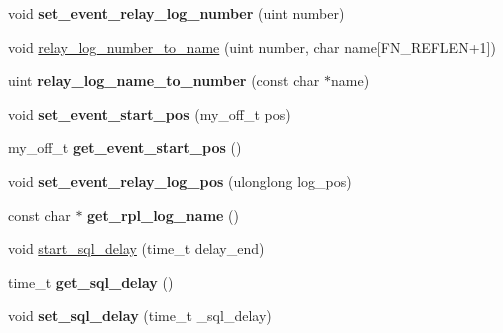 \begin{DoxyCompactItemize}
\mbox{\label{classRelay__log__info_afd826cfd193f05cae10230d6ddd5465a}} 
void {\bfseries set\+\_\+event\+\_\+relay\+\_\+log\+\_\+number} (uint number)
\item 
void \mbox{\hyperlink{classRelay__log__info_ad031830b92120f50723c41006266b8ed}{relay\+\_\+log\+\_\+number\+\_\+to\+\_\+name}} (uint number, char name\mbox{[}F\+N\+\_\+\+R\+E\+F\+L\+EN+1\mbox{]})
\item 
\mbox{\label{classRelay__log__info_acd1d09d66855c4dced93d36d8bafd10b}} 
uint {\bfseries relay\+\_\+log\+\_\+name\+\_\+to\+\_\+number} (const char $\ast$name)
\item 
\mbox{\label{classRelay__log__info_a130e6a5495f51e65e56c021e4d4d84b3}} 
void {\bfseries set\+\_\+event\+\_\+start\+\_\+pos} (my\+\_\+off\+\_\+t pos)
\item 
\mbox{\label{classRelay__log__info_a5ff858faafd7ae5945b3ad537232ccee}} 
my\+\_\+off\+\_\+t {\bfseries get\+\_\+event\+\_\+start\+\_\+pos} ()
\item 
\mbox{\label{classRelay__log__info_a2e0827f3a4c6406bd8c7e7e354eb6509}} 
void {\bfseries set\+\_\+event\+\_\+relay\+\_\+log\+\_\+pos} (ulonglong log\+\_\+pos)
\item 
\mbox{\label{classRelay__log__info_a5fc96f1bf742a918dd26500687509d04}} 
const char $\ast$ {\bfseries get\+\_\+rpl\+\_\+log\+\_\+name} ()
\item 
void \mbox{\hyperlink{classRelay__log__info_a6296341e5cd0f5fe19b20af5edb842f4}{start\+\_\+sql\+\_\+delay}} (time\+\_\+t delay\+\_\+end)
\item 
\mbox{\label{classRelay__log__info_a37beeca009c8ec11415d6fdacc361077}} 
time\+\_\+t {\bfseries get\+\_\+sql\+\_\+delay} ()
\item 
\mbox{\label{classRelay__log__info_a96d1c200de7032d415aed7945d6ac096}} 
void {\bfseries set\+\_\+sql\+\_\+delay} (time\+\_\+t \+\_\+sql\+\_\+delay)
\item 
\mbox{\label{classRelay__log__info_a852cdf695a4e254b55b845a10de0a137}} 

\end{DoxyCompactItemize}
